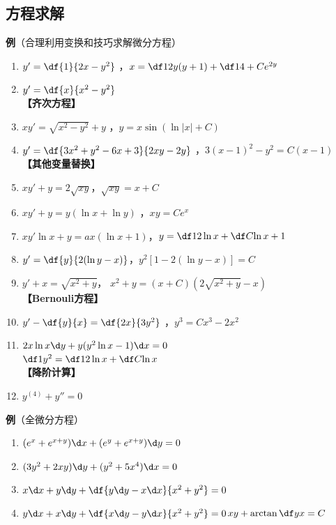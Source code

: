 \subsection{方程求解}

{\bf 例}（合理利用变换和技巧求解微分方程）

\hspace{-1ex}{\bf 【上下颠倒】}
\begin{enumerate}[(1)]
  \setlength{\itemindent}{1cm}
  \item $y'=\df{1}{2x-y^2}$ ，$x=\df12y(y+1)+\df14+Ce^{2y}$
  \item $y'=\df{x}{x^2-y^2}$\\
  {\bf 【齐次方程】}
  \item $xy'=\sqrt{x^2-y^2}+y$ ，$y=x\sin(\ln|x|+C)$
  \item $y'=\df{3x^2+y^2-6x+3}{2xy-2y}$
  ，$3(x-1)^2-y^2=C(x-1)$\\
  {\bf 【其他变量替换】}
  \item $xy'+y=2\sqrt{xy}$，$\sqrt{xy}=x+C$
  \item $xy'+y=y(\ln x+\ln y) $ ，$xy=Ce^x$
  \item $xy'\ln x+y=ax(\ln x+1)$，$y=\df12\ln x+\df C{\ln x}+1$
  \item $y'=\df{y}{2(\ln y-x)}$，$y^2[1-2(\ln y-x)]=C$
  \item $y'+x=\sqrt{x^2+y}$，
  $x^2+y=(x+C)(2\sqrt{x^2+y}-x)$\\
  {\bf 【Bernouli方程】}
  \item $y'-\df{y}{x}=\df{2x}{3y^2}$ ，$y^3=Cx^3-2x^2$
  \item $2x\ln x\d y+y(y^2\ln x-1)\d x=0$\\
  \hfill $\df1{y^2}=\df12\ln x+\df C{\ln x}$\\
  {\bf 【降阶计算】}
  \item $y^{(4)}+y''=0$
\end{enumerate}

{\bf 例}（全微分方程）
\begin{enumerate}[(1)]
  \setlength{\itemindent}{1cm}
  \item $(e^x+e^{x+y})\d x+(e^y+e^{x+y})\d y=0$
  \item $(3y^2+2xy)\d y+(y^2+5x^4)\d x=0$
  \item $x\d x+y\d y+\df{y\d y-x\d x}{x^2+y^2}=0$
  \item $y\d x+x\d y+\df{x\d y-y\d x}{x^2+y^2}=0$\dotfill$xy+\arctan\df yx=C$ 
\end{enumerate}

